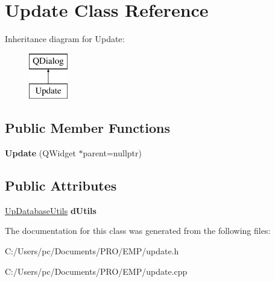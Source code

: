 \hypertarget{class_update}{}\section{Update Class Reference}
\label{class_update}
Inheritance diagram for Update\+:\begin{figure}[H]
\begin{center}
\leavevmode
\includegraphics[height=2.000000cm]{class_update}
\end{center}
\end{figure}
\subsection*{Public Member Functions}
\begin{DoxyCompactItemize}
\item 
\mbox{\label{class_update_aa4739ce246ffdcbe087f76f7d19af197}} 
{\bfseries Update} (Q\+Widget $\ast$parent=nullptr)
\end{DoxyCompactItemize}
\subsection*{Public Attributes}
\begin{DoxyCompactItemize}
\item 
\mbox{\label{class_update_a4545f0eb2b60ec434ee9d0b5448f7c4f}} 
\mbox{\hyperlink{class_up_database_utils}{Up\+Database\+Utils}} {\bfseries d\+Utils}
\end{DoxyCompactItemize}


The documentation for this class was generated from the following files\+:\begin{DoxyCompactItemize}
\item 
C\+:/\+Users/pc/\+Documents/\+P\+R\+O/\+E\+M\+P/update.\+h\item 
C\+:/\+Users/pc/\+Documents/\+P\+R\+O/\+E\+M\+P/update.\+cpp\end{DoxyCompactItemize}
